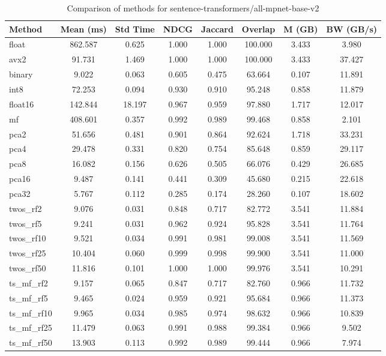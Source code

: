 \begin{table}[h]
  \centering
  \begin{tabular}{lccccccc}
    \hline
    Method       & Mean (ms) & Std Time & NDCG  & Jaccard & Overlap & M (GB) & BW (GB/s) \\
    \hline
    float        & 862.587   & 0.625    & 1.000 & 1.000   & 100.000 & 3.433  & 3.980     \\
    avx2         & 91.731    & 1.469    & 1.000 & 1.000   & 100.000 & 3.433  & 37.427    \\
    binary       & 9.022     & 0.063    & 0.605 & 0.475   & 63.664  & 0.107  & 11.891    \\
    int8         & 72.253    & 0.094    & 0.930 & 0.910   & 95.248  & 0.858  & 11.879    \\
    float16      & 142.844   & 18.197   & 0.967 & 0.959   & 97.880  & 1.717  & 12.017    \\
    mf           & 408.601   & 0.357    & 0.992 & 0.989   & 99.468  & 0.858  & 2.101     \\
    pca2         & 51.656    & 0.481    & 0.901 & 0.864   & 92.624  & 1.718  & 33.231    \\
    pca4         & 29.478    & 0.331    & 0.820 & 0.754   & 85.648  & 0.859  & 29.117    \\
    pca8         & 16.082    & 0.156    & 0.626 & 0.505   & 66.076  & 0.429  & 26.685    \\
    pca16        & 9.487     & 0.141    & 0.441 & 0.309   & 45.680  & 0.215  & 22.618    \\
    pca32        & 5.767     & 0.112    & 0.285 & 0.174   & 28.260  & 0.107  & 18.602    \\
    twos\_rf2    & 9.076     & 0.031    & 0.848 & 0.717   & 82.772  & 3.541  & 11.884    \\
    twos\_rf5    & 9.241     & 0.031    & 0.962 & 0.924   & 95.828  & 3.541  & 11.764    \\
    twos\_rf10   & 9.521     & 0.034    & 0.991 & 0.981   & 99.008  & 3.541  & 11.569    \\
    twos\_rf25   & 10.404    & 0.060    & 0.999 & 0.998   & 99.900  & 3.541  & 11.000    \\
    twos\_rf50   & 11.816    & 0.101    & 1.000 & 1.000   & 99.976  & 3.541  & 10.291    \\
    ts\_mf\_rf2  & 9.157     & 0.065    & 0.847 & 0.717   & 82.760  & 0.966  & 11.732    \\
    ts\_mf\_rf5  & 9.465     & 0.024    & 0.959 & 0.921   & 95.684  & 0.966  & 11.373    \\
    ts\_mf\_rf10 & 9.965     & 0.034    & 0.985 & 0.974   & 98.632  & 0.966  & 10.839    \\
    ts\_mf\_rf25 & 11.479    & 0.063    & 0.991 & 0.988   & 99.384  & 0.966  & 9.502     \\
    ts\_mf\_rf50 & 13.903    & 0.113    & 0.992 & 0.989   & 99.444  & 0.966  & 7.974     \\
    \hline
  \end{tabular}
  \caption{Comparison of methods for sentence-transformers/all-mpnet-base-v2}
  \label{tab:method-comparison-768}
\end{table}